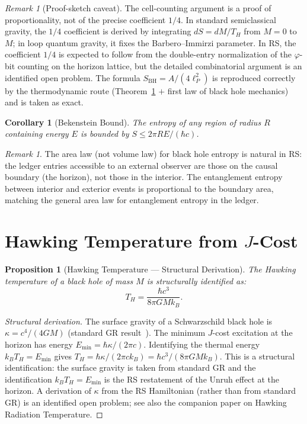 \documentclass[12pt,a4paper]{article}
\newtheorem{corollary}[theorem]{Corollary}
\newtheorem{proposition}[theorem]{Proposition}
\theoremstyle{definition}
\theoremstyle{remark}
\newtheorem{remark}[theorem]{Remark}
\begin{document}
\begin{remark}[Proof-sketch caveat]
The cell-counting argument is a proof of proportionality, not of
the precise coefficient $1/4$.  In standard semiclassical gravity,
the $1/4$ coefficient is derived by integrating $dS = dM/T_H$ from
$M = 0$ to $M$; in loop quantum gravity, it fixes the
Barbero--Immirzi parameter.  In RS, the coefficient $1/4$ is
expected to follow from the double-entry normalization of the
$\varphi$-bit counting on the horizon lattice, but the detailed
combinatorial argument is an identified open problem.  The formula
$S_{\mathrm{BH}} = A/(4\ell_P^2)$ is reproduced correctly by the
thermodynamic route (Theorem~\ref{thm:temperature} $+$ first law
of black hole mechanics) and is taken as exact.
\end{remark}

\begin{corollary}[Bekenstein Bound]
The entropy of any region of radius $R$ containing energy $E$ is
bounded by $S \leq 2\pi R E/(\hbar c)$.
\end{corollary}

\begin{remark}
The area law (not volume law) for black hole entropy is natural in
RS: the ledger entries accessible to an external observer are those
on the causal boundary (the horizon), not those in the interior.
The entanglement entropy between interior and exterior events is
proportional to the boundary area, matching the general area law
for entanglement entropy in the ledger.
\end{remark}

\section{Hawking Temperature from $J$-Cost}
\label{sec:temperature}

\begin{proposition}[Hawking Temperature --- Structural Derivation]
\label{thm:temperature}
The Hawking temperature of a black hole of mass $M$ is
structurally identified as:
\begin{equation}
  T_H = \frac{\hbar c^3}{8\pi G M k_B}.
\end{equation}
\end{proposition}

\begin{proof}[Structural derivation]
The surface gravity of a Schwarzschild black hole is
$\kappa = c^4/(4GM)$ (standard GR result~\cite{Hawking1976}).
The minimum $J$-cost excitation at the horizon has energy
$E_{\min} = \hbar\kappa/(2\pi c)$.  Identifying the thermal
energy $k_B T_H = E_{\min}$ gives
$T_H = \hbar\kappa/(2\pi c k_B) = \hbar c^3/(8\pi G M k_B)$.
This is a structural identification: the surface gravity is taken
from standard GR and the identification $k_B T_H = E_{\min}$
is the RS restatement of the Unruh effect at the horizon.  A
derivation of $\kappa$ from the RS Hamiltonian (rather than from
standard GR) is an identified open problem; see also the
companion paper on Hawking Radiation Temperature.
\end{proof}
\end{document}
